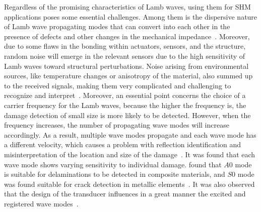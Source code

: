 Regardless of the promising characteristics of Lamb waves, using them for SHM applica\-tions poses some essential challenges.
Among them is the dispersive nature of Lamb wave propagating modes that can convert into each other in the presence of defects and other changes in the mechanical impedance~\cite{Willberg2015}. 
Moreover, due to some flaws in the bonding within actuators, sensors, and the structure, random noise will emerge in the relevant sensors due to the high sensitivity of Lamb waves toward structural perturbations.
Noise arising from environmental sources, like temperature changes or anisotropy of the material, also summed up to the received signals, making them very complicated and challenging to recognize and interpret~\cite{Willberg2015}.
Moreover, an essential point concerns the choice of a carrier frequency for the Lamb waves, because the higher the frequency is, the damage detection of small size is more likely to be detected.
However, when the frequency increases, the number of propagating wave modes will increase accordingly.
As a result, multiple wave modes propagate and each wave mode has a different velocity, which causes a problem with reflection identification and misinterpretation of the location and size of the damage~\cite{Ostachowicz2012}. 
It was found that each wave mode shows varying sensitivity to individual damage.
\textcite{Kessler2002b,Ihn2008} found that \(A0\) mode is suitable for delaminations to be detected in composite materials, and \(S0\) mode was found suitable for crack detection in metallic elements~\cite{Ihn2004,Ihn2008}.
It was also observed that the design of the transducer influences in a great manner the excited and registered wave modes~\cite{Ostachowicz2010}.